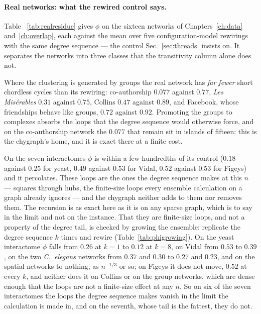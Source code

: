\paragraph{Real networks: what the rewired control says.} Table~%
\ref{tab:realresidue} gives $\phi$ on the sixteen networks of
Chapters~\ref{ch:data} and~\ref{ch:overlap}, each against the mean over five
configuration-model rewirings with the same degree sequence --- the control
Sec.~\ref{sec:threads} insists on. It separates the networks into three
classes that the transitivity column alone does not.

Where the clustering is generated by groups the real network has \emph{far
fewer} short chordless cycles than its rewiring: co-authorship $0.077$
against $0.77$, \emph{Les Mis\'erables} $0.31$ against $0.75$, Collins
$0.47$ against $0.89$, and Facebook, whose friendships behave like groups,
$0.72$ against $0.92$. Promoting the groups to complexes absorbs the loops
that the degree sequence would otherwise force, and on the co-authorship
network the $0.077$ that remain sit in islands of fifteen: this is the
chygraph's home, and it is exact there at a finite cost.

On the seven interactomes $\phi$ is within a few hundredths of its control
($0.18$ against $0.25$ for yeast, $0.49$ against $0.53$ for Vidal, $0.52$
against $0.53$ for Figeys) and it percolates. These loops are the ones the
degree sequence makes at this $n$ --- squares through hubs, the finite-size
loops every ensemble calculation on a graph already ignores --- and the
chygraph neither adds to them nor removes them. The recursion is as exact
here as it is on any sparse graph, which is to say in the limit and not on
the instance. That they are finite-size loops, and not a property of the
degree tail, is checked by growing the ensemble: replicate the degree
sequence $k$ times and rewire (Table~\ref{tab:phigrowing}). On the yeast
interactome $\phi$ falls from $0.26$ at $k=1$ to $0.12$ at $k=8$, on
Vidal from $0.53$ to $0.39$, on the two \emph{C.~elegans} networks from
$0.37$ and $0.30$ to $0.27$ and $0.23$, and on the spatial networks to
nothing, as $n^{-1/3}$ or so; on Figeys it does not move, $0.52$ at every
$k$, and neither does it on Collins or on the group networks, which are
dense enough that the loops are not a finite-size effect at any $n$. So
on six of the seven interactomes the loops the degree sequence makes
vanish in the limit the calculation is made in, and on the seventh, whose
tail is the fattest, they do not.


